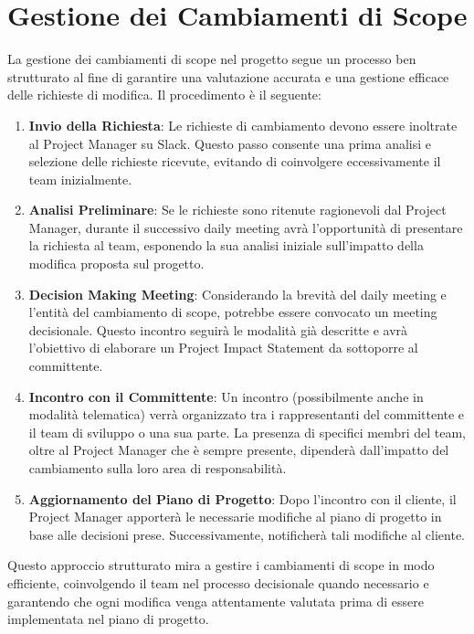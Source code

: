 \section{Gestione dei Cambiamenti di Scope}

La gestione dei cambiamenti di scope nel progetto segue un processo ben strutturato al fine di garantire una valutazione accurata e una gestione efficace delle richieste di modifica. Il procedimento è il seguente:

\begin{enumerate}
    \item \textbf{Invio della Richiesta}: Le richieste di cambiamento devono essere inoltrate al Project Manager su Slack. Questo passo consente una prima analisi e selezione delle richieste ricevute, evitando di coinvolgere eccessivamente il team inizialmente.
    \item \textbf{Analisi Preliminare}: Se le richieste sono ritenute ragionevoli dal Project Manager, durante il successivo daily meeting avrà l'opportunità di presentare la richiesta al team, esponendo la sua analisi iniziale sull'impatto della modifica proposta sul progetto.
    \item \textbf{Decision Making Meeting}: Considerando la brevità del daily meeting e l'entità del cambiamento di scope, potrebbe essere convocato un meeting decisionale. Questo incontro seguirà le modalità già descritte e avrà l'obiettivo di elaborare un Project Impact Statement da sottoporre al committente.
    \item \textbf{Incontro con il Committente}: Un incontro (possibilmente anche in modalità telematica) verrà organizzato tra i rappresentanti del committente e il team di sviluppo o una sua parte. La presenza di specifici membri del team, oltre al Project Manager che è sempre presente, dipenderà dall'impatto del cambiamento sulla loro area di responsabilità.
    \item \textbf{Aggiornamento del Piano di Progetto}: Dopo l'incontro con il cliente, il Project Manager apporterà le necessarie modifiche al piano di progetto in base alle decisioni prese. Successivamente, notificherà tali modifiche al cliente.
\end{enumerate}

Questo approccio strutturato mira a gestire i cambiamenti di scope in modo efficiente, coinvolgendo il team nel processo decisionale quando necessario e garantendo che ogni modifica venga attentamente valutata prima di essere implementata nel piano di progetto.
